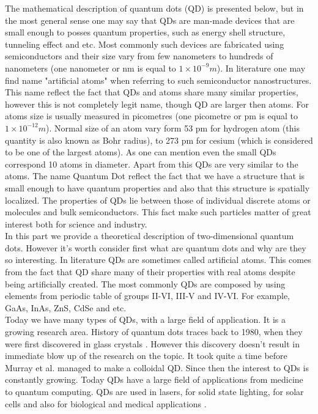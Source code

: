 \documentclass[twoside,english]{uiofysmaster}
\theoremstyle{definition}
\begin{document}
The mathematical description of quantum dots (QD) is presented below, but in the most general sense one may say that QDs are man-made devices that are small enough to posses quantum properties, such as energy shell structure, tunneling effect and etc. Most commonly such devices are fabricated using semiconductors and their size vary from few nanometers to hundreds of nanometers (one nanometer or nm is equal to $1\times 10^{-9} m$). In literature one may find name "artificial atoms" when referring to such  semiconductor nanostructures. This name reflect the fact that QDs and atoms share many similar properties, however this is not completely legit name, though QD are larger then atoms. For atoms size is usually measured in picometres  (one picometre or pm is equal to $1\times 10^{-12} m$).  Normal size of an atom vary form 53 pm for hydrogen atom (this quantity is also known as Bohr radius), to  273 pm for cesium (which is considered to be one of the largest atoms). As one can mention even the small QDs correspond 10 atoms in diameter. Apart from this QDs are very similar to the atoms. The name Quantum Dot reflect the fact that we have a structure that is small enough to have quantum properties and also that this structure is spatially localized. The properties of QDs lie between those of individual discrete atoms or molecules and bulk semiconductors. This fact make such particles matter of great interest both for science and industry.\\
In this part we provide a theoretical description of two-dimensional quantum dots. However it's worth consider first what are quantum dots and why are they so interesting. In literature QDs are sometimes called artificial atoms. This comes from the fact that QD share many of their properties with real atoms despite being artificially created. The most commonly QDs are composed by using elements from periodic table of groups II-VI, III-V and IV-VI. For example, GaAs, InAs, ZnS, CdSe and etc.\\
Today we have many types of QDs, with a large field of application. It is a growing research area. History of quantum dots traces back to 1980, when they were first discovered in glass crystals \cite{ekimovaiQuantumSizeEffect1981}. However this discovery doesn't result in immediate blow up of the research on the topic. It took quite a time before Murray et al. \cite{murraySynthesisCharacterizationNearly1993} managed to make a colloidal QD. Since then the interest to QDs is constantly growing. Today QDs have a large field of applications from medicine to quantum computing. QDs are used in lasers, for solid state lighting, for solar cells and also for biological and medical applications \cite{zhuQuantumDots2013}.  \\
\end{document}
